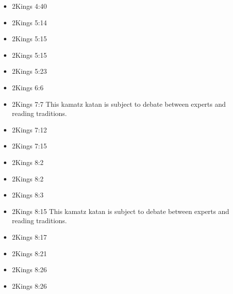 \documentclass[14pt]{book}
\begin{document}
\begin{multicols}{2}
\begin{itemize}
													\item 2Kings 4:40
													
													\item 2Kings 5:14
													
													\item 2Kings 5:15
													
													\item 2Kings 5:15
													
													\item 2Kings 5:23
													
													\item 2Kings 6:6
													
													\item 2Kings 7:7 This kamatz katan is subject to debate between experts and reading traditions.
													
													\item 2Kings 7:12
													
													\item 2Kings 7:15
													
													\item 2Kings 8:2
													
													\item 2Kings 8:2
													
													\item 2Kings 8:3
													
													\item 2Kings 8:15 This kamatz katan is subject to debate between experts and reading traditions.
													
													\item 2Kings 8:17
													
													\item 2Kings 8:21
													
													\item 2Kings 8:26
													
													\item 2Kings 8:26
													

\end{itemize}
\end{multicols}
\end{document}
